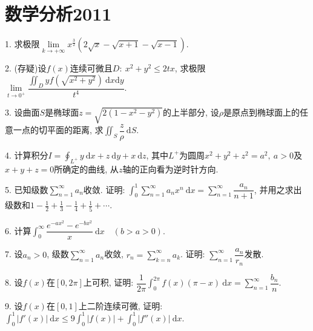 \documentclass[12pt, a4paper, twoside]{ctexart}%
\newcommand{\rmd}{\mathrm{d}} %
\begin{document}
	\section{数学分析2011}
	1. 求极限$\lim\limits_{k\rightarrow+\infty}x^\frac{3}{2}(2\sqrt{x}-\sqrt{x+1}-\sqrt{x-1})$.\par 
	2. (存疑)设$f(x)$连续可微且$D:\ x^2+y^2\leq2tx$, 求极限$\lim\limits_{t\rightarrow0^+}\dfrac{\iint_D yf(\sqrt{x^2+y^2})\ \rmd x\rmd y}{t^4}.$\par 
	3. 设曲面$S$是椭球面$z=\sqrt{2(1-x^2-y^2)}$的上半部分, 设$\rho$是原点到椭球面上的任意一点的切平面的距离, 求$\iint_S\dfrac{z}{\rho}\ \rmd S$.\par 
	4. 计算积分$I=\oint_{L^+}y\ \rmd x+z\ \rmd y+x\ \rmd z$, 其中$L^+$为圆周$x^2+y^2+z^2=a^2,\ a>0$及$x+y+z=0$所确定的曲线, 从$z$轴的正向看为逆时针方向.\par
	5. 已知级数$\sum\limits_{n=1}^\infty a_n$收敛. 证明: $\int_{0}^{1}\sum\limits_{n=1}^{\infty}a_nx^n\ \rmd x=\sum\limits_{n=1}^\infty\dfrac{a_n}{n+1}$, 并用之求出级数和$1-\frac{1}{2}+\frac{1}{3}-\frac{1}{4}+\frac{1}{5}+\cdots$.\par 
	6. 计算$\int_0^\infty\dfrac{e^{-ax^2}-e^{-bx^2}}{x}\ \rmd x\quad(b>a>0)$.\par 
	7. 设$a_n>0$, 级数$\sum\limits_{n=1}^\infty a_n$收敛, $r_n=\sum\limits_{k=n}^\infty a_k$. 证明: $\sum\limits_{n=1}^\infty \dfrac{a_n}{r_n}$发散. \par
	8. 设$f(x)$在$[0,2\pi]$上可积, 证明: $\dfrac{1}{2\pi}\int_{0}^{2\pi}f(x)(\pi-x)\ \rmd x=\sum\limits_{n=1}^{\infty}\dfrac{b_n}{n}$.\par
	9. 设$f(x)$在$[0,1]$上二阶连续可微, 证明: $\int_{0}^{1}|f'(x)|\ \rmd x\leq 9\int_{0}^{1}|f(x)|+\int_0^1|f''(x)|\ \rmd x.$\par
	\clearpage
\end{document}
